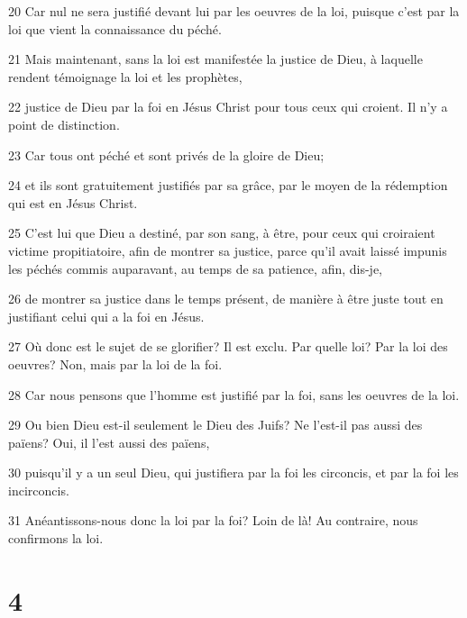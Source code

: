 \par 20 Car nul ne sera justifié devant lui par les oeuvres de la loi, puisque c'est par la loi que vient la connaissance du péché.
\par 21 Mais maintenant, sans la loi est manifestée la justice de Dieu, à laquelle rendent témoignage la loi et les prophètes,
\par 22 justice de Dieu par la foi en Jésus Christ pour tous ceux qui croient. Il n'y a point de distinction.
\par 23 Car tous ont péché et sont privés de la gloire de Dieu;
\par 24 et ils sont gratuitement justifiés par sa grâce, par le moyen de la rédemption qui est en Jésus Christ.
\par 25 C'est lui que Dieu a destiné, par son sang, à être, pour ceux qui croiraient victime propitiatoire, afin de montrer sa justice, parce qu'il avait laissé impunis les péchés commis auparavant, au temps de sa patience, afin, dis-je,
\par 26 de montrer sa justice dans le temps présent, de manière à être juste tout en justifiant celui qui a la foi en Jésus.
\par 27 Où donc est le sujet de se glorifier? Il est exclu. Par quelle loi? Par la loi des oeuvres? Non, mais par la loi de la foi.
\par 28 Car nous pensons que l'homme est justifié par la foi, sans les oeuvres de la loi.
\par 29 Ou bien Dieu est-il seulement le Dieu des Juifs? Ne l'est-il pas aussi des païens? Oui, il l'est aussi des païens,
\par 30 puisqu'il y a un seul Dieu, qui justifiera par la foi les circoncis, et par la foi les incirconcis.
\par 31 Anéantissons-nous donc la loi par la foi? Loin de là! Au contraire, nous confirmons la loi.

\chapter{4}

